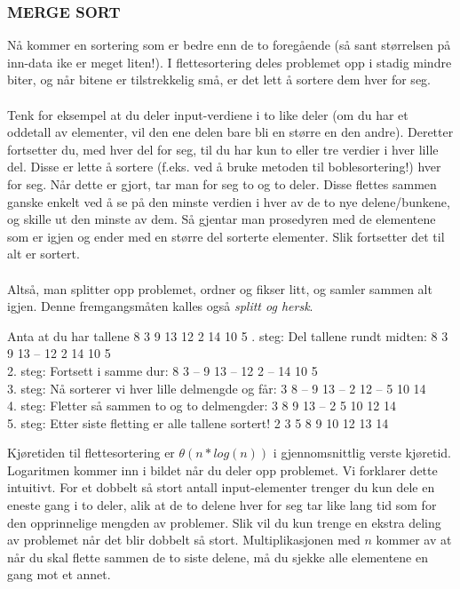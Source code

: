 \subsubsection{MERGE SORT}
Nå kommer en sortering som er bedre enn de to foregående (så sant størrelsen på inn-data ike er meget liten!). I flettesortering deles problemet opp i stadig mindre biter, og når bitene er tilstrekkelig små, er det lett å sortere dem hver for seg.
\\\\
Tenk for eksempel at du deler input-verdiene i to like deler (om du har et oddetall av elementer, vil den ene delen bare bli en større en den andre). Deretter fortsetter du, med hver del for seg, til du har kun to eller tre verdier i hver lille del. Disse er lette å sortere (f.eks. ved å bruke metoden til boblesortering!) hver for seg. Når dette er gjort, tar man for seg to og to deler. Disse flettes sammen ganske enkelt ved å se på den minste verdien i hver av de to nye delene/bunkene, og skille ut den minste av dem. Så gjentar man prosedyren med de elementene som er igjen og ender med en større del sorterte elementer. Slik fortsetter det til alt er sortert.
\\\\
Altså, man splitter opp problemet, ordner og fikser litt, og samler sammen alt igjen. Denne fremgangsmåten kalles også \textit{splitt og hersk}.

\begin{boxed}
Anta at du har tallene 8 3 9 13 12 2 14 10 5
\newline {}. steg: Del tallene rundt midten:  \hfill 8 3 9 13 – 12 2 14 10 5\\
2. steg: Fortsett i samme dur:  \hfill 8 3 – 9 13 – 12 2 – 14 10 5\\
3. steg: Nå sorterer vi hver lille delmengde og får:   \hfill 3 8 – 9 13 – 2 12 – 5 10 14\\
4. steg: Fletter så sammen to og to delmengder: \hfill 3 8 9 13 – 2 5 10 12 14\\
5. steg: Etter siste fletting er alle tallene sortert!    \hfill 2 3 5 8 9 10 12 13 14
\end{boxed}

\noindent Kjøretiden til flettesortering er \textbf{$\theta(n*log(n))$} i gjennomsnittlig verste kjøretid. Logaritmen kommer inn i bildet når du deler opp problemet. Vi forklarer dette intuitivt. For et dobbelt så stort antall input-elementer trenger du kun dele en eneste gang i to deler, alik at de to delene hver for seg tar like lang tid som for den opprinnelige mengden av problemer. Slik vil du kun trenge en ekstra deling av problemet når det blir dobbelt så stort. Multiplikasjonen med $n$ kommer av at når du skal flette sammen de to siste delene, må du sjekke alle elementene en gang mot et annet. 

